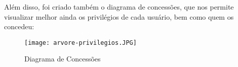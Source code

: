 \documentclass[12pt,a4paper]{article}
\begin{document}
Além disso, foi criado também o diagrama de concessões, que nos permite visualizar melhor ainda os privilégios de cada usuário, bem como quem os concedeu:

\begin{figure}[H]
    \centering
    \texttt{[image: arvore-privilegios.JPG]}
    \caption{Diagrama de Concessões}
    \label{fig:diagrama}
\end{figure}
\end{document}
